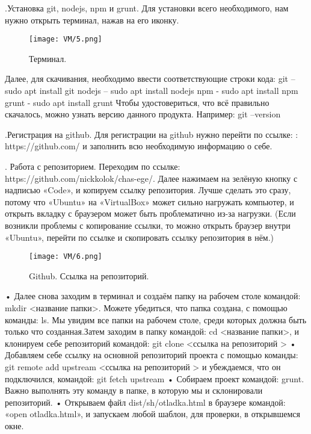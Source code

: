 .\quad Установка git, nodejs, npm и grunt.
\newline Для установки всего необходимого, нам нужно открыть терминал, нажав на его иконку.  

\begin{figure}[h]
		\centering
		\texttt{[image: VM/5.png]}
\caption{Терминал.}
\label{ris:image}
\end{figure}

\quad Далее, для скачивания, необходимо ввести соответствующие строки кода:
\newline git – sudo apt install git
\newline nodejs – sudo apt install nodejs
\newline npm - sudo apt install npm
\newline grunt - sudo apt install grunt
\newline Чтобы удостовериться, что всё правильно скачалось, можно узнать версию данного продукта. Например: git –version

.\quad  Регистрация на github.
\newline \quad Для регистрации на github нужно перейти по ссылке: : https://github.com/ и заполнить всю необходимую информацию о себе.

. \quad Работа с репозиторием.
\newline \quad Переходим по ссылке: https://github.com/nickkolok/chas-ege/. Далее нажимаем на зелёную кнопку с надписью «Code», и копируем ссылку репозитория. Лучше сделать это сразу, потому что «Ubuntu» на «VirtualBox» может сильно нагружать компьютер, и открыть вкладку с браузером может быть проблематично из-за нагрузки. (Если возникли проблемы с копирование ссылки, то можно открыть браузер внутри «Ubuntu», перейти по ссылке и скопировать ссылку репозитория в нём.)

\begin{figure}[h]
		\centering
		\texttt{[image: VM/6.png]}
\caption{Github. Ссылка на репозиторий.}
\label{ris:image}
\end{figure}

• Далее снова заходим в терминал и создаём папку на рабочем столе командой: mkdir <название папки>. Можете убедиться, что папка создана, с помощью команды: ls. Мы увидим все папки на рабочем столе, среди которых должна быть только что созданная.Затем заходим в папку командой: cd <название папки>, и клонируем себе репозиторий командой: git clone <ссылка на репозиторий >
  \newline   • Добавляем себе ссылку на основной репозиторий проекта с помощью команды: git remote add upstream <ссылка на репозиторий > и убеждаемся, что он подключился, командой: git fetch upstream 
   \newline  • Собираем проект командой: grunt. Важно выполнять эту команду в папке, в которую мы и склонировали репозиторий.
  \newline  • Открываем файл dist/sh/otladka.html в браузере командой: «open otladka.html», и запускаем любой шаблон, для проверки, в открывшемся окне.

